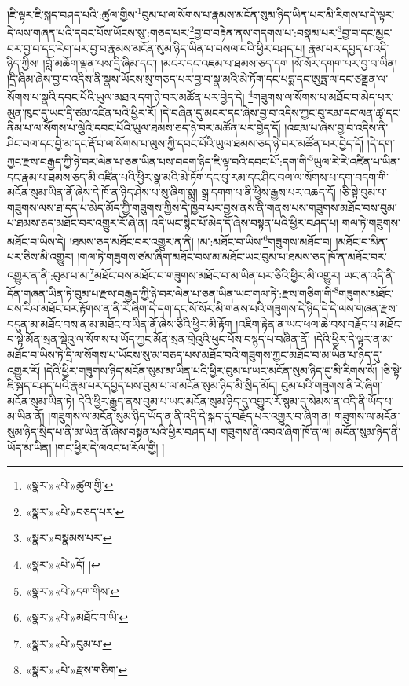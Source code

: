 །ཇི་ལྟར་ཇི་སྐད་བཤད་པའི་:ཚུལ་གྱིས་\footnote{«སྣར་»«པེ་»ཚུལ་གྱི་}བུམ་པ་ལ་སོགས་པ་རྣམས་མངོན་སུམ་ཉིད་ཡིན་པར་མི་རིགས་པ་དེ་ལྟར་དེ་ལས་གཞན་པའི་དབང་པོས་ཡོངས་སུ་:གཅད་པར་\footnote{«སྣར་»«པེ་»བཅད་པར་}བྱ་བ་བརྟེན་ནས་གདགས་པ་:བསྣམ་པར་\footnote{«སྣར་»བསྣམས་པར་}བྱ་བ་དང་མྱང་བར་བྱ་བ་དང་རེག་པར་བྱ་བ་རྣམས་མངོན་སུམ་ཉིད་ཡིན་པ་བསལ་བའི་ཕྱིར་བཤད་པ། རྣམ་པར་དཔྱད་པ་འདི་ཉིད་ཀྱིས། །བློ་མཆོག་ལྡན་པས་དྲི་ཞིམ་དང་། །མངར་དང་འཇམ་པ་ཐམས་ཅད་དག །སོ་སོར་དགག་པར་བྱ་བ་ཡིན། །དྲི་ཞིམ་ཞེས་བྱ་བ་འདིས་ནི་སྣས་ཡོངས་སུ་གཅད་པར་བྱ་བ་སྣ་མའི་མེ་ཏོག་དང་པདྨ་དང་ཨུཏྤ་ལ་དང་ཙནྡན་ལ་སོགས་པ་སྣའི་དབང་པོའི་ཡུལ་མཐའ་དག་ཉེ་བར་མཚོན་པར་བྱེད་དེ། \footnote{«སྣར་»«པེ་»དོ། ། }གཟུགས་ལ་སོགས་པ་མཐོང་བ་མེད་པར་མུན་ཁུང་དུ་ཡང་དྲི་ཙམ་འཛིན་པའི་ཕྱིར་རོ། །དེ་བཞིན་དུ་མངར་དང་ཞེས་བྱ་བ་འདིས་ཀྱང་བུ་རམ་དང་ལན་ཚྭ་དང་ནིམ་པ་ལ་སོགས་པ་ལྕེའི་དབང་པོའི་ཡུལ་ཐམས་ཅད་ཉེ་བར་མཚོན་པར་བྱེད་དོ། །འཇམ་པ་ཞེས་བྱ་བ་འདིས་ནི་ཤིང་བལ་དང་བྱེ་མ་དང་རྡོ་བ་ལ་སོགས་པ་ལུས་ཀྱི་དབང་པོའི་ཡུལ་ཐམས་ཅད་ཉེ་བར་མཚོན་པར་བྱེད་དོ། །དེ་དག་ཀྱང་རྫས་བརྒྱད་ཀྱི་ཉེ་བར་ལེན་པ་ཅན་ཡིན་པས་བདག་ཉིད་ཇི་ལྟ་བའི་དབང་པོ་:དག་གི་\footnote{«སྣར་»«པེ་»དག་གིས་}ཡུལ་རེ་རེ་འཛིན་པ་ཡིན་དང་རྣམ་པ་ཐམས་ཅད་མི་འཛིན་པའི་ཕྱིར་སྣ་མའི་མེ་ཏོག་དང་བུ་རམ་དང་ཤིང་བལ་ལ་སོགས་པ་དག་བདག་གི་མངོན་སུམ་ཡིན་ནོ་ཞེས་དེ་ཁོ་ན་ཉིད་ཤེས་པ་སུ་ཞིག་སྨྲ། སྒྲ་དགག་པ་ནི་ཕྱིས་རྒྱས་པར་འཆད་དོ། །ཅི་སྟེ་བུམ་པ་གཟུགས་ལས་ཐ་དད་པ་མེད་མོད་ཀྱི་གཟུགས་ཀྱིས་དེ་ཁྱབ་པར་བྱས་ནས་ནི་གནས་པས་གཟུགས་མཐོང་བས་བུམ་པ་ཐམས་ཅད་མཐོང་བར་འགྱུར་རོ་ཞེ་ན། འདི་ཡང་སྙིང་པོ་མེད་དོ་ཞེས་བསྟན་པའི་ཕྱིར་བཤད་པ། གལ་ཏེ་གཟུགས་མཐོང་བ་ཡིས་དེ། །ཐམས་ཅད་མཐོང་བར་འགྱུར་ན་ནི། །མ་:མཐོང་བ་ཡིས་\footnote{«སྣར་»«པེ་»མཐོང་བ་ཡི་}གཟུགས་མཐོང་བ། །མཐོང་བ་མིན་པར་ཅིས་མི་འགྱུར། །གལ་ཏེ་གཟུགས་ཙམ་ཞིག་མཐོང་བས་མ་མཐོང་ཡང་བུམ་པ་ཐམས་ཅད་ཁོ་ན་མཐོང་བར་འགྱུར་ན་ནི་:བུམ་པ་མ་\footnote{«སྣར་»«པེ་»བུམ་པ་}མཐོང་བས་མཐོང་བ་གཟུགས་མཐོང་བ་མ་ཡིན་པར་ཅིའི་ཕྱིར་མི་འགྱུར། ཡང་ན་འདི་ནི་དོན་གཞན་ཡིན་ཏེ་བུམ་པ་རྫས་བརྒྱད་ཀྱི་ཉེ་བར་ལེན་པ་ཅན་ཡིན་ཡང་གལ་ཏེ་:རྫས་གཅིག་གི་\footnote{«སྣར་»«པེ་»རྫས་གཅིག་}གཟུགས་མཐོང་བས་རིལ་མཐོང་བར་རྟོགས་ན་ནི་རེ་ཞིག་དེ་དག་དང་སོ་སོར་མི་གནས་པའི་གཟུགས་དེ་ཉིད་དེ་དེ་ལས་གཞན་རྫས་བདུན་མ་མཐོང་བས་ན་མ་མཐོང་བ་ཡིན་ནོ་ཞེས་ཅིའི་ཕྱིར་མི་རྟོག །འཇིག་རྟེན་ན་ཡང་ཕལ་ཆེ་བས་བརྗོད་པ་མཐོང་བ་སྟེ་མོན་སྲན་སྡེའུ་ལ་སོགས་པ་ཡོད་ཀྱང་མོན་སྲན་གྲེའུའི་ཕུང་པོས་བསྙད་པ་བཞིན་ནོ། །དེའི་ཕྱིར་དེ་ལྟར་ན་མ་མཐོང་བ་ཡིས་ཏེ་དྲི་ལ་སོགས་པ་ཡོངས་སུ་མ་བཅད་པས་མཐོང་བའི་གཟུགས་ཀྱང་མཐོང་བ་མ་ཡིན་པ་ཉིད་དུ་འགྱུར་རོ། །དེའི་ཕྱིར་གཟུགས་ཉིད་མངོན་སུམ་མ་ཡིན་པའི་ཕྱིར་བུམ་པ་ཡང་མངོན་སུམ་ཉིད་དུ་མི་རིགས་སོ། །ཅི་སྟེ་ཇི་སྐད་བཤད་པའི་རྣམ་པར་དཔྱད་པས་བུམ་པ་ལ་མངོན་སུམ་ཉིད་མི་སྲིད་མོད། བུམ་པའི་གཟུགས་ནི་རེ་ཞིག་མངོན་སུམ་ཡིན་ཏེ། དེའི་ཕྱིར་རྒྱུད་ནས་བུམ་པ་ཡང་མངོན་སུམ་ཉིད་དུ་འགྱུར་རོ་སྙམ་དུ་སེམས་ན་འདི་ནི་ཡོད་པ་མ་ཡིན་ནོ། །གཟུགས་ལ་མངོན་སུམ་ཉིད་ཡོད་ན་ནི་འདི་དེ་སྐད་དུ་བརྗོད་པར་འགྱུར་བ་ཞིག་ན། གཟུགས་ལ་མངོན་སུམ་ཉིད་སྲིད་པ་ནི་མ་ཡིན་ནོ་ཞེས་བསྟན་པའི་ཕྱིར་བཤད་པ། གཟུགས་ནི་འབའ་ཞིག་ཁོ་ན་ལ། མངོན་སུམ་ཉིད་ནི་ཡོད་མ་ཡིན། །གང་ཕྱིར་དེ་ལའང་ཕ་རོལ་གྱི། །
